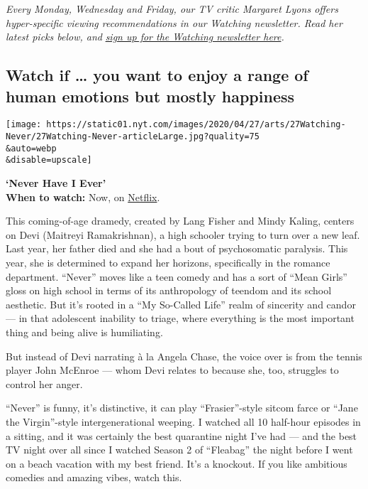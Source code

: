 \emph{Every Monday, Wednesday and Friday, our TV critic Margaret Lyons
offers hyper-specific viewing recommendations in our Watching
newsletter. Read her latest picks below, and}
\href{https://www.nytimes.com/newsletters/watching}{\emph{sign up for
the Watching newsletter here}}\emph{.}

\hypertarget{watch-if--you-want-to-enjoy-a-range-of-human-emotions-but-mostly-happiness}{%
\subsection{Watch if \ldots{} you want to enjoy a range of human
emotions but mostly
happiness}\label{watch-if--you-want-to-enjoy-a-range-of-human-emotions-but-mostly-happiness}}

\texttt{[image: https://static01.nyt.com/images/2020/04/27/arts/27Watching-Never/27Watching-Never-articleLarge.jpg?quality=75\\\&auto=webp\\\&disable=upscale]}

\textbf{`Never Have I Ever'}\\
\textbf{When to watch:} Now, on
\href{https://www.netflix.com/title/80179190}{Netflix}.

This coming-of-age dramedy, created by Lang Fisher and Mindy Kaling,
centers on Devi (Maitreyi Ramakrishnan), a high schooler trying to turn
over a new leaf. Last year, her father died and she had a bout of
psychosomatic paralysis. This year, she is determined to expand her
horizons, specifically in the romance department. ``Never'' moves like a
teen comedy and has a sort of ``Mean Girls'' gloss on high school in
terms of its anthropology of teendom and its school aesthetic. But it's
rooted in a ``My So-Called Life'' realm of sincerity and candor --- in
that adolescent inability to triage, where everything is the most
important thing and being alive is humiliating.

But instead of Devi narrating à la Angela Chase, the voice over is from
the tennis player John McEnroe --- whom Devi relates to because she,
too, struggles to control her anger.

``Never'' is funny, it's distinctive, it can play ``Frasier''-style
sitcom farce or ``Jane the Virgin''-style intergenerational weeping. I
watched all 10 half-hour episodes in a sitting, and it was certainly the
best quarantine night I've had --- and the best TV night over all since
I watched Season 2 of ``Fleabag'' the night before I went on a beach
vacation with my best friend. It's a knockout. If you like ambitious
comedies and amazing vibes, watch this.

